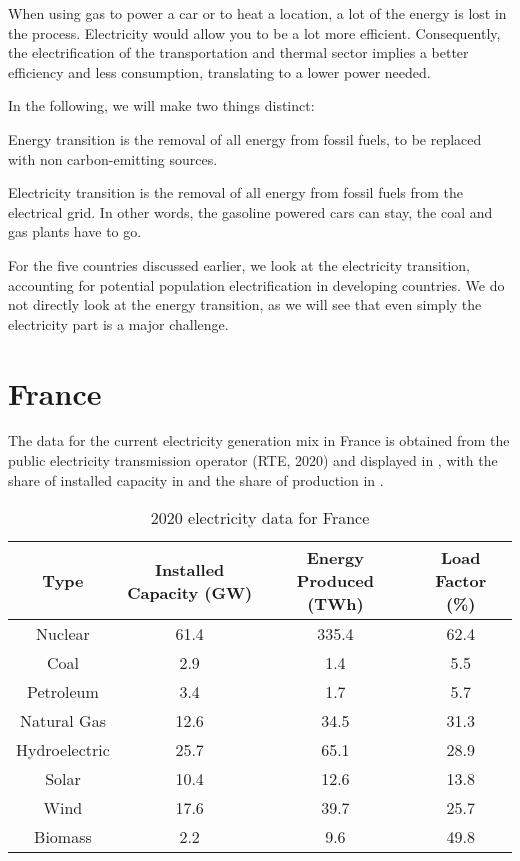 When using gas to power a car or to heat a location, a lot of the energy is lost in the process. Electricity would allow you to be a lot more efficient. Consequently, the electrification of the transportation and thermal sector implies a better efficiency and less consumption, translating to a lower power needed.

In the following, we will make two things distinct:

\begin{kaobox}[frametitle=Energy Transition]
Energy transition is the removal of all energy from fossil fuels, to be replaced with non carbon-emitting sources.
\end{kaobox}

\begin{kaobox}[frametitle=Electricity Transition]
Electricity transition is the removal of all energy from fossil fuels from the electrical grid. In other words, the gasoline powered cars can stay, the coal and gas plants have to go.
\end{kaobox}


For the five countries discussed earlier, we look at the electricity transition, accounting for potential population electrification in developing countries. We do not directly look at the energy transition, as we will see that even simply the electricity part is a major challenge.

\section{France}

The data for the current electricity generation mix in France is obtained from the public electricity transmission operator (RTE, 2020) and displayed in , with the share of installed capacity in  and the share of production in .

\begin{table*}[ht]
\caption[2020 electricity data for France]{2020 electricity data for France}
\begin{tabular}{ c c c c }
	\toprule
	Type & Installed Capacity (GW) & Energy Produced (TWh) & Load Factor (\%) \\
	\midrule
	Nuclear & 61.4 & 335.4 & 62.4\\
	Coal & 2.9 & 1.4 & 5.5\\
	Petroleum & 3.4 & 1.7 & 5.7\\
	Natural Gas & 12.6 & 34.5 & 31.3\\
	Hydroelectric & 25.7 & 65.1 & 28.9\\
	Solar & 10.4 & 12.6 & 13.8\\
	Wind & 17.6 & 39.7 & 25.7\\
	Biomass & 2.2 & 9.6 & 49.8\\
	\bottomrule
\end{tabular}
\end{table*}


